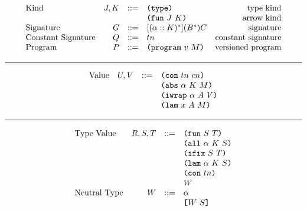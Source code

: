 \documentclass[../zerepoch-core-specification.tex]{subfiles}
\begin{document}
\begin{minipage}{\linewidth}
\[\begin{array}{lrclr}
        \textrm{Kind}             & J,K    & ::= & \texttt{(} \texttt{type} \texttt{)}{}                   & \textrm{type kind}\\
                                  &        &     & \texttt{(} \texttt{fun} ~ J ~ K \texttt{)}                & \textrm{arrow kind}\\
        \textrm{Signature}        & G      & ::= & [(\alpha :: K)^*](B^*)C     & \textrm{signature}\\
        \textrm{Constant Signature}   & Q      & ::= & tn                     & \textrm{constant signature}\\
        \textrm{Program}          & P      & ::= & \texttt{(} \texttt{program} ~ v ~ M \texttt{)}             & \textrm{versioned program}

    \end{array}\]
    \label{fig:grammar}
\end{minipage}

\medskip
\hrule
\medskip

\begin{minipage}{\linewidth}
    \centering
    \[\begin{array}{lrcl}
        \textrm{Value}            & U, V   & ::= & \texttt{(} \texttt{con} ~ tn ~ cn \texttt{)}         \\
                                  &        &     & \texttt{(} \texttt{abs} ~ \alpha ~ K ~ M \texttt{)}   \\
                                  &        &     & \texttt{(} \texttt{iwrap} ~ \alpha ~ A ~ V \texttt{)} \\
                                  &        &     & \texttt{(} \texttt{lam} ~ x ~ A ~ M \texttt{)}
    \end{array}\]
    \label{fig:values}
\end{minipage}

\medskip
\hrule
\medskip

\begin{minipage}{\linewidth}
    \centering
    \[\begin{array}{lrcl}
        \textrm{Type Value}       & R,S,T  & ::= & \texttt{(} \texttt{fun} ~ S ~ T \texttt{)}          \\
                                  &        &     & \texttt{(} \texttt{all} ~ \alpha ~ K ~ S \texttt{)}  \\
                                  &        &     & \texttt{(} \texttt{ifix} ~ S ~ T \texttt{)}          \\
                                  &        &     & \texttt{(} \texttt{lam} ~ \alpha ~ K ~ S \texttt{)}  \\
                                  &        &     & \texttt{(} \texttt{con} ~ tn \texttt{)}           \\
                                  &        &     & W                    \\
        \textrm{Neutral Type}     & W      & ::= & \alpha               \\
                                  &        &     & \texttt{[} W ~ S \texttt{]}          \\
    \end{array}\]
    \label{fig:type-values}
\end{minipage}
\end{document}
